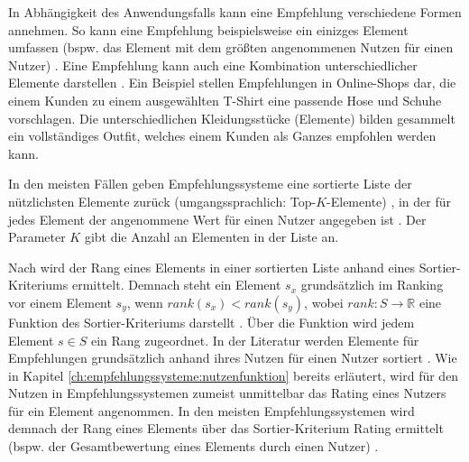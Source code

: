 In Abhängigkeit des Anwendungsfalls kann eine Empfehlung verschiedene Formen annehmen.
So kann eine Empfehlung beispielsweise ein einizges Element umfassen (bspw. das Element mit dem größten angenommenen Nutzen für einen Nutzer) \cite[S. 6]{ricci:inbook}.
Eine Empfehlung kann auch eine Kombination unterschiedlicher Elemente darstellen \cite[S. 7]{ricci:inbook}.
Ein Beispiel stellen Empfehlungen in Online-Shops dar, die einem Kunden zu einem ausgewählten T-Shirt eine passende Hose und Schuhe vorschlagen.
Die unterschiedlichen Kleidungsstücke (Elemente) bilden gesammelt ein vollständiges Outfit, welches einem Kunden als Ganzes empfohlen werden kann.

In den meisten Fällen geben Empfehlungssysteme eine sortierte Liste der nützlichsten Elemente zurück (umgangssprachlich: Top-$K$-Elemente) \cite[S. 3]{recommenderSystems:2016}\cite[S. 141]{ekstrand:article}, in der für jedes Element der angenommene Wert für einen Nutzer angegeben ist \cite[S. 6]{ricci:inbook}.
Der Parameter $K$ gibt die Anzahl an Elementen in der Liste an.

Nach \textcite[S. 900]{adomavicius:article} wird der Rang eines Elements in einer sortierten Liste anhand eines Sortier-Kriteriums ermittelt.
Demnach steht ein Element $s_{x}$ grundsätzlich im Ranking vor einem Element $s_{y}$, wenn $rank(s_{x})<rank(s_{y})$, wobei $rank: S \rightarrow \mathbb{R}$ eine Funktion des Sortier-Kriteri\-ums darstellt \cite[S. 900]{adomavicius:article}.
Über die Funktion wird jedem Element $s \in S$ ein Rang zugeordnet.
In der Literatur werden Elemente für Empfehlungen grundsätzlich anhand ihres Nutzen für einen Nutzer sortiert \cite[S. 735]{adomavicius:inproceedings}\cite[S. 10f.]{ricci:inbook}.
Wie in Kapitel \ref{ch:empfehlungssysteme:nutzenfunktion} bereits erläutert, wird für den Nutzen in Empfehlungssystemen zumeist unmittelbar das Rating eines Nutzers für ein Element angenommen.
In den meisten Empfehlungssystemen wird demnach der Rang eines Elements über das Sortier-Kriterium Rating ermittelt (bspw. der Gesamtbewertung eines Elements durch einen Nutzer) \cite[S. 900]{adomavicius:article}.

